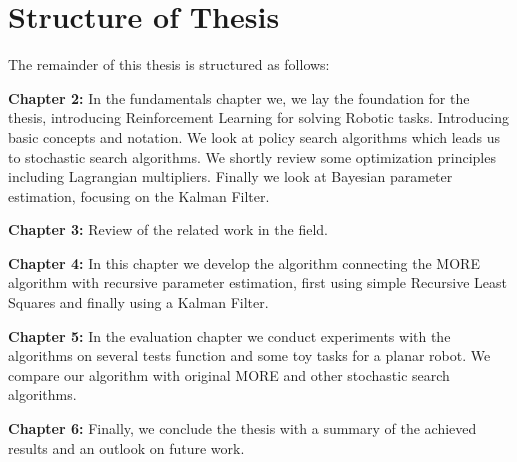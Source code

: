 \section{Structure of Thesis}
The remainder of this thesis is structured as follows:

\textbf{Chapter 2:} In the fundamentals chapter we, we lay the foundation for
the thesis, introducing Reinforcement Learning for solving Robotic
tasks. Introducing basic concepts and notation. We look at policy
search algorithms which leads us to stochastic search algorithms.
We shortly review some optimization principles including
Lagrangian multipliers. Finally we look at Bayesian parameter
estimation, focusing on the Kalman Filter.

\textbf{Chapter 3:} Review of the related work in the field.

\textbf{Chapter 4:} In this chapter we develop the algorithm connecting
the MORE algorithm with recursive parameter estimation, first
using simple Recursive Least Squares and finally using a Kalman Filter.

\textbf{Chapter 5:} In the evaluation chapter we conduct experiments
with the algorithms on several tests function and some toy tasks
for a planar robot. We compare our algorithm with original MORE and
other stochastic search algorithms.

\textbf{Chapter 6:} Finally, we conclude the thesis with a summary of
the achieved results and an outlook on future work.